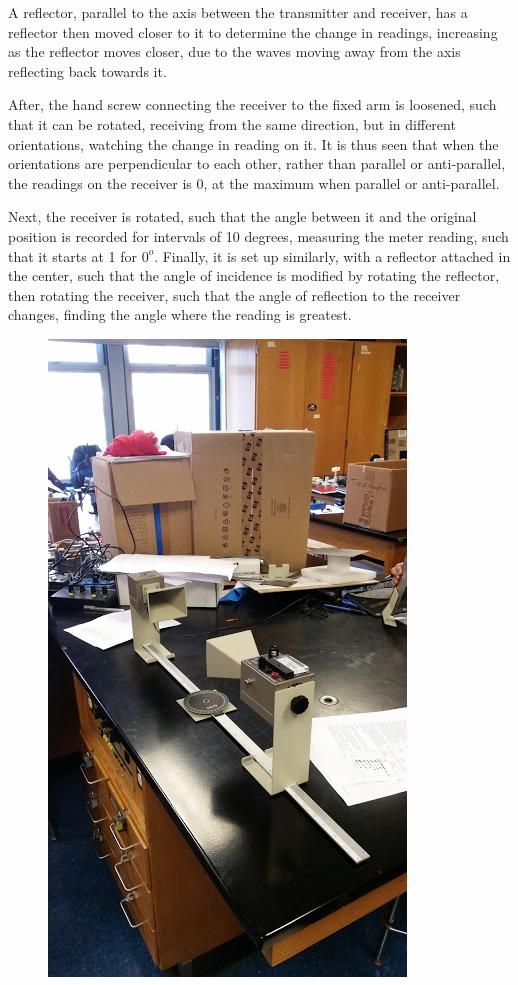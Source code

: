 \documentclass[11pt, titlepage]{article}
\begin{document}
A reflector, parallel to the axis between the transmitter and receiver, has a reflector then moved closer to it to determine the change in readings, increasing as the reflector moves closer, due to the waves moving away from the axis reflecting back towards it.

After, the hand screw connecting the receiver to the fixed arm is loosened, such that it can be rotated, receiving from the same direction, but in different orientations, watching the change in reading on it. It is thus seen that when the orientations are perpendicular to each other, rather than parallel or anti-parallel, the readings on the receiver is 0, at the maximum when parallel or anti-parallel.

Next, the receiver is rotated, such that the angle between it and the original position is recorded for intervals of 10 degrees, measuring the meter reading, such that it starts at 1 for $0^o$. Finally, it is set up similarly, with a reflector attached in the center, such that the angle of incidence is modified by rotating the reflector, then rotating the receiver, such that the angle of reflection to the receiver changes, finding the angle where the reading is greatest.

\begin{figure}[h]
\centering
\hspace*{0cm}
\includegraphics[scale=1]{lab61.jpg}
\vspace*{0cm}
\end{figure}
\end{document}
